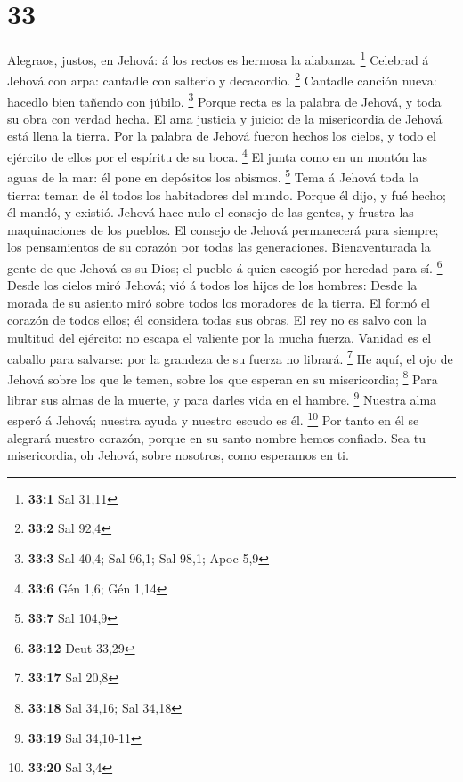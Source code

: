 \hypertarget{section-32}{%
\section{33}\label{section-32}}

 Alegraos, justos, en Jehová: á los rectos es hermosa la
alabanza. \footnote{\textbf{33:1} Sal 31,11}  Celebrad á
Jehová con arpa: cantadle con salterio y decacordio. \footnote{\textbf{33:2}
  Sal 92,4}  Cantadle canción nueva: hacedlo bien tañendo
con júbilo. \footnote{\textbf{33:3} Sal 40,4; Sal 96,1; Sal 98,1; Apoc
  5,9}  Porque recta es la palabra de Jehová, y toda su obra
con verdad hecha.  El ama justicia y juicio: de la
misericordia de Jehová está llena la tierra.  Por la palabra
de Jehová fueron hechos los cielos, y todo el ejército de ellos por el
espíritu de su boca. \footnote{\textbf{33:6} Gén 1,6; Gén 1,14}
 El junta como en un montón las aguas de la mar: él pone en
depósitos los abismos. \footnote{\textbf{33:7} Sal 104,9} 
Tema á Jehová toda la tierra: teman de él todos los habitadores del
mundo.  Porque él dijo, y fué hecho; él mandó, y existió.
 Jehová hace nulo el consejo de las gentes, y frustra las
maquinaciones de los pueblos.  El consejo de Jehová
permanecerá para siempre; los pensamientos de su corazón por todas las
generaciones.  Bienaventurada la gente de que Jehová es su
Dios; el pueblo á quien escogió por heredad para sí. \footnote{\textbf{33:12}
  Deut 33,29}  Desde los cielos miró Jehová; vió á todos
los hijos de los hombres:  Desde la morada de su asiento
miró sobre todos los moradores de la tierra.  El formó el
corazón de todos ellos; él considera todas sus obras.  El
rey no es salvo con la multitud del ejército: no escapa el valiente por
la mucha fuerza.  Vanidad es el caballo para salvarse: por
la grandeza de su fuerza no librará. \footnote{\textbf{33:17} Sal 20,8}
 He aquí, el ojo de Jehová sobre los que le temen, sobre
los que esperan en su misericordia; \footnote{\textbf{33:18} Sal 34,16;
  Sal 34,18}  Para librar sus almas de la muerte, y para
darles vida en el hambre. \footnote{\textbf{33:19} Sal 34,10-11}
 Nuestra alma esperó á Jehová; nuestra ayuda y nuestro
escudo es él. \footnote{\textbf{33:20} Sal 3,4}  Por tanto
en él se alegrará nuestro corazón, porque en su santo nombre hemos
confiado.  Sea tu misericordia, oh Jehová, sobre nosotros,
como esperamos en ti.

